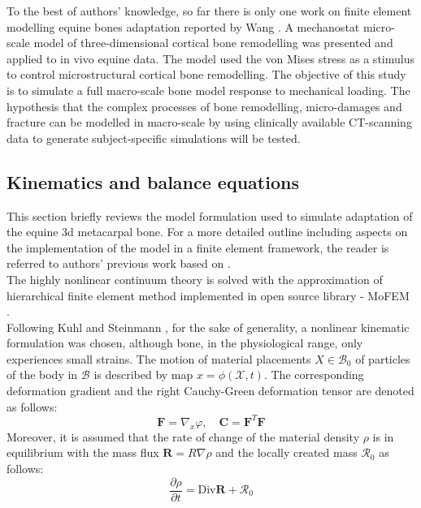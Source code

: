 \documentclass[11pt]{ACMEarticle}
\numberwithin{equation}{section}
\begin{document}
To the best of authors' knowledge, so far there is only one work on finite element modelling equine bones adaptation reported by Wang \citep{Wang2016}. A mechanostat micro-scale model of three-dimensional cortical bone remodelling was presented and applied to in vivo equine data. The model used the von Mises stress as a stimulus to control microstructural cortical bone remodelling. 
The objective of this study is to simulate a full macro-scale bone model response to mechanical loading. The hypothesis that the complex processes of bone remodelling, micro-damages and fracture can be modelled in macro-scale by using clinically available CT-scanning data to generate subject-specific simulations will be tested. %
\subsection{Kinematics and balance equations}
This section briefly reviews the model formulation used to simulate  adaptation of the equine 3d metacarpal bone. For a more detailed outline including aspects on the implementation of the model in a finite element framework, the reader is referred to authors' previous work \cite{lewandowski2017} based on 
\citep{kuhl2003computational}.\\
The highly nonlinear continuum theory is solved with the approximation of hierarchical finite element method implemented in open source library - MoFEM \citep{mofem2017}.  \\
Following Kuhl and Steinmann \citep{kuhl2003computational}, for the sake of generality, a nonlinear kinematic formulation was chosen, although bone, in the physiological range, only experiences small strains. The motion of material placements ${X} \in  \mathcal{B}_0 $ of particles of the body in $\mathcal{B}$ is described by map $x = \phi(\mathcal{X},t)$. The corresponding deformation gradient and the right Cauchy-Green deformation tensor are denoted as follows: 
\begin{equation}
\mathbf{F}=\nabla_{x}\varphi, \quad \mathbf{C}=\mathbf{F}^{T}\mathbf{F}
\end{equation}
Moreover, it is assumed that the rate of change of the material density $\rho$ is in equilibrium with the mass flux $\mathbf{R} = R\nabla\rho$ and the locally created mass $\mathcal{R}_0$ as follows: 
\begin{equation}
\frac{\partial\rho}{\partial t}=\mathrm{Div}\mathbf{R} + \mathcal{R}_0
\label{eq:mass_balance}
\end{equation}
\end{document}
